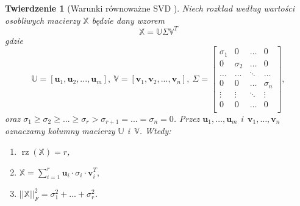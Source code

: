 \documentclass[12pt,a4paper]{report}
\newtheorem{tw}[df]{Twierdzenie}
\newcommand{\rz}[1]{\operatorname{rz}\left({#1} \right)}
\begin{document}
\begin{tw}[Warunki równoważne SVD {\citep{ulafiir}}]%
Niech rozkład według wartości osobliwych macierzy $\mathbb{X}$ będzie dany wzorem
$$
\mathbb{X}=\mathbb{U} \Sigma \mathbb{V}^T
$$
gdzie 
$$\mathbb{U}=[\mathbf{u}_1,\mathbf{u}_2,...,\mathbf{u}_m], \: \mathbb{V} = [\mathbf{v}_1,\mathbf{v}_2,...,\mathbf{v}_n], \: \Sigma = \left[
        \begin{array}{cccc}
         \sigma_{1} & 0 & \ldots & 0 \\
         0 & \sigma_{2} & \ldots & 0 \\
         \ldots & \ldots& \ddots & \ldots \\
         0 & 0 & \ldots & \sigma_{n} \\
         \vdots & \vdots & \ddots & \vdots \\
         0 & 0 & \ldots & 0 \\
         \end{array}
      \right],$$
oraz 
$\sigma_{1}\geq \sigma_{2} \geq ... \geq \sigma_{r} > \sigma_{r+1} = ... = \sigma_{n} = 0$. Przez $\mathbf{u}_1, \ldots, \mathbf{u}_m$ i~$\mathbf{v}_1, \ldots, \mathbf{v}_n$ oznaczamy kolumny macierzy $\mathbb{U}$ i~$\mathbb{V}$.
Wtedy:
\begin{enumerate}
\item $\rz{\mathbb{X}} = r$, 
\item $\mathbb{X} = \sum_{i=1}^r \mathbf{u}_i \cdot\sigma_i \cdot \mathbf{v}_i^T,$
\item $||\mathbb{X}||_F^2 = \sigma_{1}^2+...+\sigma_{r}^2$.
\end{enumerate}
\end{tw}
\end{document}
